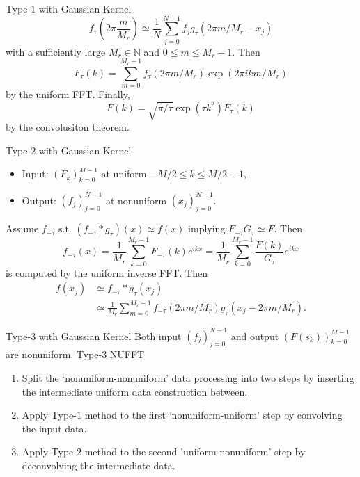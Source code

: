 \documentclass{beamer}
\begin{document}
\begin{frame}{Type-$1$ with Gaussian Kernel}
  \begin{equation}
      f_{\tau}(2\pi\frac{m}{M_{r}}) 
    \simeq \frac{1}{N}\sum_{j=0}^{N-1} f_{j} g_{\tau}(2\pi m/M_{r} - x_{j})
  \end{equation}
  with a sufficiently large $M_{r} \in \mathbb{N}$ and $0 \le m \le M_{r}-1$. Then
  \begin{equation}
    F_{\tau}(k) = \sum_{m=0}^{M_{r}-1}f_{\tau}(2\pi m/M_{r})\exp(2\pi ikm/M_{r})
  \end{equation}
  by the uniform FFT. Finally, 
  \begin{equation}
    F(k) = \sqrt{\pi/\tau}\exp(\tau k^2)F_{\tau}(k)
  \end{equation}
  by the convolusiton theorem.
\end{frame}

\begin{frame}{Type-$2$ with Gaussian Kernel}
  \begin{itemize}
    \item Input: $(F_{k})_{k=0}^{M-1}$ at uniform $-M/2 \le k \le M/2-1$,
    \item Output: $(f_{j})_{j=0}^{N-1}$ at nonuniform $(x_{j})_{j=0}^{N-1}$.
  \end{itemize}
  Assume $f_{-\tau}$ s.t. $(f_{-\tau}\ast g_{\tau})(x) \simeq f(x)$ implying 
  $F_{-\tau}G_{\tau} \simeq F$. Then 
  \begin{equation}
      f_{-\tau}(x) 
    = \frac{1}{M_{r}}\sum_{k=0}^{M_{r}-1} F_{-\tau}(k)e^{ikx}
    = \frac{1}{M_{r}}\sum_{k=0}^{M_{r}-1} \frac{F(k)}{G_{\tau}}e^{ikx}
  \end{equation}
  is computed by the uniform inverse FFT. Then 
  \begin{align}
       f(x_{j}) 
    &\simeq f_{-\tau}\ast g_{\tau}(x_{j}) \\
    &\simeq \frac{1}{M_{r}}\sum_{m=0}^{M_{r}-1}f_{-\tau}(2\pi m/M_{r})g_{\tau}(x_{j} - 2\pi m/M_{r}).
  \end{align}
\end{frame}

\begin{frame}{Type-$3$ with Gaussian Kernel}
  Both input $(f_{j})_{j=0}^{N-1}$ and output $(F(s_{k}))_{k=0}^{M-1}$ are nonuniform.
  Type-$3$ NUFFT 
  \begin{enumerate}
    \item Split the `nonuniform-nonuniform' data processing into two steps
    by inserting the intermediate uniform data construction between.
    \item Apply Type-$1$ method to the first `nonuniform-uniform' step by convolving the input data.
    \item Apply Type-$2$ method to the second 'uniform-nonuniform' step by deconvolving the intermediate data.
  \end{enumerate}
\end{frame}
\end{document}
